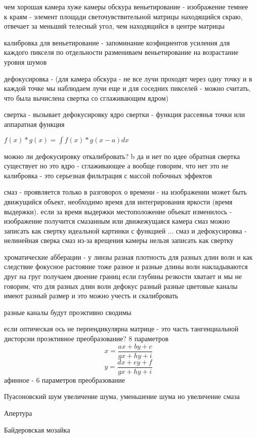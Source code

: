 \documentclass[]{report}
\begin{document}
чем хорошая камера хуже камеры обскура
веньетирование - изображение темнее к краям - элемент площади светочувствительной матрицы находящийся скраю, отвечает за меньший телесный угол, чем находящийся в центре матрицы

калибровка для веньетирование - запоминание коэфициентов усиления для каждого пикселя по отдельности
размениваем веньетирование на возрастание уровня шумов

дефокусировка - (для камера обскура - не все лучи проходят через одну точку и в каждой точке мы наблюдаем лучи еще и для соседних пикселей - можно считать, что была вычислена свертка со сглаживающим ядром) 

свертка - вызывает дефокусировку
ядро свертки - функция рассеянья точки или аппаратная функция

$f(x)*g(x) = \int f(x)*g(x-a)dx$

можно ли дефокусировку откалибровать?
b да и нет
по идее обратная свертка существует
но это ядро - сглаживающее
а вообще говорим, что нет
это не калибровка - это серьезная фильтрация с массой побочных эффектов

смаз - проявляется только в разговорох о времени - на изображении может быть движущийся объект, необходимо время для интегрирования яркости (время выдержки).
если за время выдержки местоположение объекат изменилось - изображение получится смазанным
или движежущаяся камера
смаз можно  записать как свертку идеальной картинки с функцией ...
смаз и дефокусировка - нелинейная сверка
смаз из-за врещения камеры нельзя записать как свертку

хроматические абберации - у линзы разная плотность для разных длин волн и как следствие фокусное растояние тоже разное и разные длины волн накладываются друг на груг
получаем двоение границ
если глубины резкости хватает и мы не говорим, что для разных длин волн дефокус разный
разные цветовые каналы имеют разный размер и это можно учесть и скалибровать

разные каналы будут проэктивно сводимы

если оптическая ось не перпендикулярна матрице - это часть тангенциальной дисторсии
проэктивное преобразование? 8 параметров
$$x=\frac{ax+by+c}{gx+hy+i}$$
$$y=\frac{dx+ey+f}{gx+hy+i}$$
афинное - 6 параметров преобразование


Пуасоновский шум
увеличение шума, уменьшение шума но увеличение смаза

Апертура

Байдеровская мозайка
\end{document}
